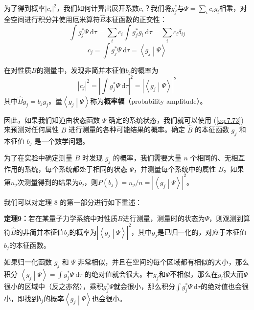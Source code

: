     为了得到概率$\left|c_i\right|^2$，我们如何计算出展开系数$c_i$？我们将$g_j^{\ast}$与$\Psi = \sum_{i}c_i g_i$相乘，对全空间进行积分并使用厄米算符$\hat{B}$本征函数的正交性：
    \begin{equation*}
        \int g_j^{\ast}\Psi \: \mathrm{d}\tau = \sum_ic_i\int g_j^{\ast} g_i \: \mathrm{d}\tau = \sum_i c_i\delta_{ij}
    \end{equation*}
    \begin{equation}
        c_j = \int g_j^{\ast}\Psi \: \mathrm{d}\tau = \left\langle g_j \middle| \Psi \right\rangle
        \label{eq:7.72}
    \end{equation}

    在对性质$B$的测量中，发现非简并本征值$b_j$的概率为
    \begin{equation}
        \left|c_j\right|^2 = \left|\int g_j^{\ast}\Psi \: \mathrm{d}\tau\right|^2 = \left|\left\langle g_j \middle| \Psi \right\rangle\right|^2
        \label{eq:7.73}
    \end{equation}
    其中$\hat{B}g_j = b_jg_j$。量$\left\langle g_j \middle| \Psi \right\rangle$称为\textbf{概率幅}（probability amplitude）。

    因此，如果我们知道由状态函数 $\Psi$ 确定的系统状态，我们就可以使用 (\ref{eq:7.73}) 来预测对任何属性 $B$ 进行测量的各种可能结果的概率。确定 $\hat{B}$ 的本征函数 $g_j$ 和本征值 $b_j$ 是一个数学问题。

    为了在实验中确定测量 $B$ 时发现 $g_j$ 的概率，我们需要大量 $n$ 个相同的、无相互作用的系统，每个系统都处于相同的状态 $\Psi$，并测量每个系统中的属性 $B$。如果第$n_j$次测量得到的结果为$b_j$，则$P\left(b_j\right) = n_j/n = \left|\left\langle g_j \middle| \Psi \right\rangle\right|^2$。

    我们可以对定理 8 的第一部分进行如下重述：
    \begin{center}
        \parbox{0.8\textwidth}{
            \textbf{定理9：}若在某量子力学系统中对性质$B$进行测量，测量时的状态为$\Psi$，则观测到算符$\hat{B}$的非简并本征值$b_j$的概率为$\left|\left\langle g_j \middle| \Psi \right\rangle\right|^2$，其中$g_j$是已归一化的，对应于本征值$b_j$的本征函数。
        }
    \end{center}

    如果归一化函数 $g_j$ 和 $\Psi$ 非常相似，并且在空间的每个区域都有相似的大小，那么积分 $\left\langle g_j \middle| \Psi \right\rangle = \int g_j^{\ast}\Psi\:\mathrm{d}\tau$ 的绝对值就会很大。若$g_j$和$\Psi$不相似，那么在$g_i$很大而$\Psi$很小的区域中（反之亦然），乘积$g_j^{\ast}\Psi$就会很小，那么积分$\int g_j^{\ast}\Psi\:\mathrm{d}\tau$的绝对值也会很小，即找到$b_j$的概率$\left\langle g_j \middle| \Psi \right\rangle$也会很小。


